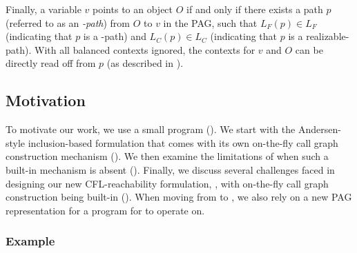 
Finally,
a variable $v$  points to an object $O$ if and only if there exists a path $p$ 
(referred to
as an \emph{\manuLFC-path})
from $O$ to $v$ in the PAG, such that 
$L_F(p)\in L_F$ (indicating that $p$ is a
\flowsto-path)
and $L_C(p)\in L_C$ (indicating that $p$ is a realizable-path). With all balanced contexts ignored, the
contexts for $v$ and $O$ can be directly read off from $p$ (as described in ).
 
\subsection{Motivation}
\label{subsec:motivation}


To motivate our work, we use a small program ().
We start with the Andersen-style inclusion-based formulation that comes with its own  on-the-fly call
graph construction mechanism (). We then examine the limitations of \manuLFC when such a built-in
mechanism is absent (). Finally, we discuss several challenges faced 
 in designing
our new CFL-reachability formulation, \LFCR, with on-the-fly call
graph construction being built-in
(). When moving from \manuLFC to \LFCR, we also rely on
a new PAG representation for a program for \LFCR to operate on.
 
 


\subsubsection{Example}
\label{subsubsec:example}








